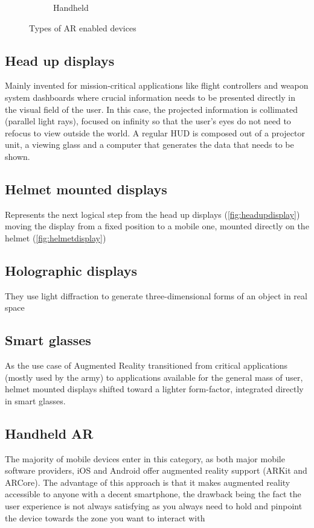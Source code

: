 \documentclass[12 pct]{report}
\begin{document}
\begin{figure}[h!]
\begin{subfigure}[b]{0.4\linewidth}
    \caption{Handheld}
  \end{subfigure}
  \caption{Types of AR enabled devices}
  \label{fig:artypes}
\end{figure}

\subsection*{Head up displays}
Mainly invented for mission-critical applications \cite{livingston2011military} like flight controllers and weapon system dashboards where crucial information needs to be presented directly in the visual field of the user. In this case, the projected information is collimated (parallel light rays), focused on infinity so that the user’s eyes do not need to refocus to view outside the world.
A regular HUD \cite{beckwith2015augmented} is composed out of a projector unit, a viewing glass and a computer that generates the data that needs to be shown.

\subsection*{Helmet mounted displays}
Represents the next logical step from the head up displays (\ref{fig:headupdisplay}) moving the display from a fixed position to a mobile one, mounted directly on the helmet (\ref{fig:helmetdisplay})

\subsection*{Holographic displays}
They use light diffraction \cite{lucente1997interactive} to generate three-dimensional forms of an object in real space

\subsection*{Smart glasses}
As the use case of Augmented Reality transitioned from critical applications (mostly used by the army) to applications available for the general mass of user, helmet mounted displays shifted toward a lighter form-factor, integrated directly in smart glasses. 

\subsection*{Handheld AR}
The majority of mobile devices enter in this category, as both major mobile software providers, iOS \cite{wilson2007iphone} and Android \cite{rogers2009android} offer augmented reality support (ARKit and ARCore). The advantage of this approach is that it makes augmented reality accessible to anyone with a decent smartphone, the drawback being the fact the user experience is not always satisfying as you always need to hold and pinpoint the device towards the zone you want to interact with
\end{document}
